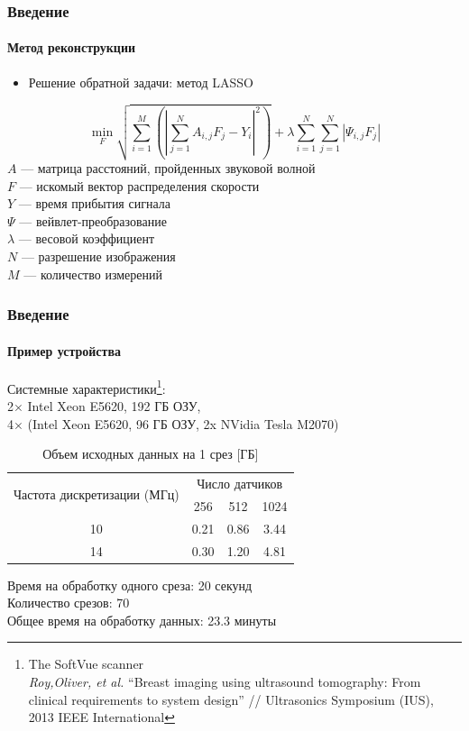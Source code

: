 \documentclass{beamer}
\begin{document}
\begin{frame}
\frametitle{Введение}
\framesubtitle{Метод реконструкции}
\begin{itemize}
	\item Решение обратной задачи: метод LASSO
\end{itemize}
$$ \min_F  \sqrt{\displaystyle\sum_{i=1}^{M} (|\displaystyle\sum_{j=1}^N A_{i,j}F_j - Y_i |^2)} + \lambda \displaystyle\sum_{i=1}^N \displaystyle\sum_{j=1}^N| \Psi_{i,j} F_j| $$
$A$ --- матрица расстояний, пройденных звуковой волной\\
$F$ --- искомый вектор распределения скорости\\
$Y$ --- время прибытия сигнала\\
$\Psi$ --- вейвлет-преобразование\\
$\lambda$ --- весовой коэффициент\\
$N$ --- разрешение изображения \\
$M$ --- количество измерений\\
\end{frame}

\begin{frame}
\frametitle{Введение}
\framesubtitle{Пример устройства}
Системные характеристики\footnote{\tiny The SoftVue scanner\\\textit{Roy,Oliver, et al.} ``Breast imaging using ultrasound tomography: From clinical requirements to system design'' // Ultrasonics Symposium (IUS), 2013 IEEE International}:\\\small
2$\times$ Intel Xeon E5620, 192 ГБ ОЗУ,\\
4$\times$ (Intel Xeon E5620, 96 ГБ ОЗУ, 2x NVidia Tesla M2070)
\begin{table}[h]
\centering
\caption{\small Объем исходных данных на 1 срез [ГБ]}
\begin{tabular}{ c || c | c | c }
    \hline
    \multirow{2}{*}{Частота дискретизации (МГц)} & \multicolumn{3}{c}{Число датчиков}  \\ %
    & 256 & 512 & 1024 \\
    \hline
    10 & 0.21 & 0.86 & 3.44 \\
    14 & 0.30 & 1.20 & 4.81 \\
    \hline
\end{tabular}
\end{table}
\normalsize

Время на обработку одного среза: 20 секунд\\
Количество срезов: 70\\
Общее время на обработку данных: 23.3 минуты\\

\end{frame}
\end{document}
